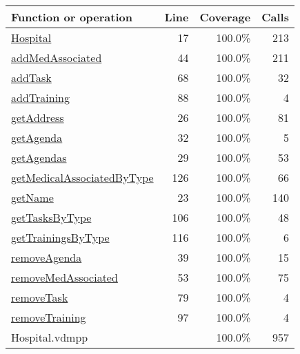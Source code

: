 \bigskip
\begin{longtable}{|l|r|r|r|}
\hline
Function or operation & Line & Coverage & Calls \\
\hline
\hline
\hyperref[Hospital:17]{Hospital} & 17&100.0\% & 213 \\
\hline
\hyperref[addMedAssociated:44]{addMedAssociated} & 44&100.0\% & 211 \\
\hline
\hyperref[addTask:68]{addTask} & 68&100.0\% & 32 \\
\hline
\hyperref[addTraining:88]{addTraining} & 88&100.0\% & 4 \\
\hline
\hyperref[getAddress:26]{getAddress} & 26&100.0\% & 81 \\
\hline
\hyperref[getAgenda:32]{getAgenda} & 32&100.0\% & 5 \\
\hline
\hyperref[getAgendas:29]{getAgendas} & 29&100.0\% & 53 \\
\hline
\hyperref[getMedicalAssociatedByType:126]{getMedicalAssociatedByType} & 126&100.0\% & 66 \\
\hline
\hyperref[getName:23]{getName} & 23&100.0\% & 140 \\
\hline
\hyperref[getTasksByType:106]{getTasksByType} & 106&100.0\% & 48 \\
\hline
\hyperref[getTrainingsByType:116]{getTrainingsByType} & 116&100.0\% & 6 \\
\hline
\hyperref[removeAgenda:39]{removeAgenda} & 39&100.0\% & 15 \\
\hline
\hyperref[removeMedAssociated:53]{removeMedAssociated} & 53&100.0\% & 75 \\
\hline
\hyperref[removeTask:79]{removeTask} & 79&100.0\% & 4 \\
\hline
\hyperref[removeTraining:97]{removeTraining} & 97&100.0\% & 4 \\
\hline
\hline
Hospital.vdmpp & & 100.0\% & 957 \\
\hline
\end{longtable}

